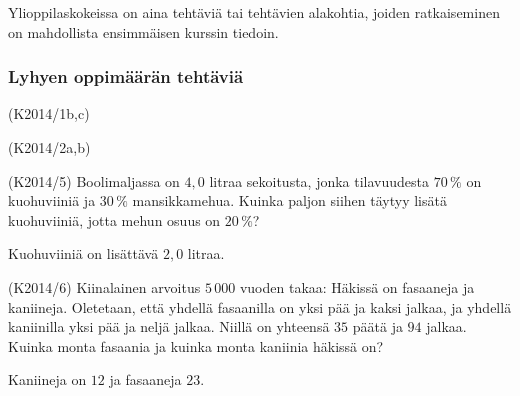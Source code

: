 Ylioppilaskokeissa on aina tehtäviä tai tehtävien alakohtia, joiden ratkaiseminen on mahdollista ensimmäisen kurssin tiedoin.

\subsubsection*{Lyhyen oppimäärän tehtäviä}

\begin{tehtava} (K2014/1b,c) 
    \begin{vastaus}
    \end{vastaus}	
\end{tehtava}

\begin{tehtava}(K2014/2a,b)
    \begin{vastaus}
    \end{vastaus}	
\end{tehtava}

\begin{tehtava} (K2014/5) Boolimaljassa on $4,0$ litraa sekoitusta, jonka tilavuudesta $70\,\%$ on kuohuviiniä ja $30\,\%$ mansikkamehua. Kuinka paljon siihen täytyy lisätä kuohuviiniä, jotta mehun osuus on $20\,\%$?
    \begin{vastaus}
	    Kuohuviiniä on lisättävä $2,0$ litraa.
    \end{vastaus}
\end{tehtava}

\begin{tehtava} (K2014/6) Kiinalainen arvoitus $5\,000$ vuoden takaa: Häkissä on fasaaneja ja kaniineja. Oletetaan, että yhdellä fasaanilla on yksi pää ja kaksi jalkaa, ja yhdellä kaniinilla yksi pää ja neljä jalkaa. Niillä on yhteensä $35$ päätä ja $94$ jalkaa. Kuinka monta fasaania ja kuinka monta kaniinia häkissä on?
	\begin{vastaus}
		Kaniineja on $12$ ja fasaaneja $23$.
	\end{vastaus}
\end{tehtava}

